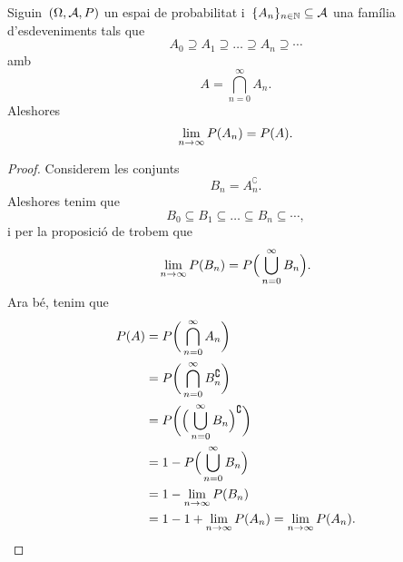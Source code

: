\documentclass[../Apunts.tex]{subfiles}
\begin{document}
	\begin{proposition}
		\label{prop:continuitat sequencial per successions decreixents}
		Siguin~\((\Omega,\mathcal{A},P)\) un espai de probabilitat i~\(\{A_{n}\}_{n\in\mathbb{N}}\subseteq\mathcal{A}\) una família d'esdeveniments tals que
		\[A_{0}\supseteq A_{1}\supseteq\dots\supseteq A_{n}\supseteq\cdots\]
		amb
		\[A=\bigcap_{n=0}^{\infty}A_{n}.\]
		Aleshores
		\[\lim_{n\to\infty}P(A_{n})=P(A).\]
		\begin{proof}
			Considerem les conjunts
			\[B_{n}=A_{n}^{\complement}.\]
			Aleshores tenim que
			\[B_{0}\subseteq B_{1}\subseteq\dots\subseteq B_{n}\subseteq\cdots,\]
			i per la proposició de  trobem que
			\[\lim_{n\to\infty}P(B_{n})=P\Big(\bigcup_{n=0}^{\infty}B_{n}\Big).\]
			Ara bé, tenim que
			\begin{align*}
				P(A)&=P\bigg(\bigcap_{n=0}^{\infty}A_{n}\bigg) \\
				&=P\bigg(\bigcap_{n=0}^{\infty}B_{n}^{\complement}\bigg) \\
				&=P\bigg(\Big(\bigcup_{n=0}^{\infty}B_{n}\Big)^{\complement}\bigg) \\
				&=1-P\Big(\bigcup_{n=0}^{\infty}B_{n}\Big) \\
				&=1-\lim_{n\to\infty}P(B_{n}) \\
				&=1-1+\lim_{n\to\infty}P(A_{n})=\lim_{n\to\infty}P(A_{n}).\qedhere
			\end{align*}
		\end{proof}
	\end{proposition}
\end{document}
